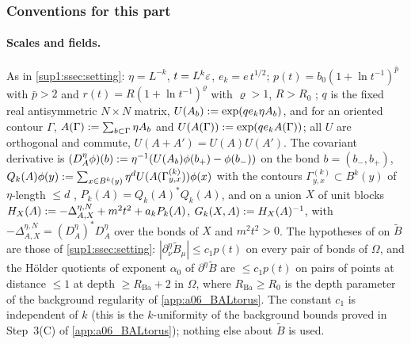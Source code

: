 \subsubsection*{Conventions for this part}

\paragraph{Scales and fields.} As in \cref{sup1:ssec:setting}: $\eta=L^{-k}$, $t=L^k\varepsilon$, $e_k=e\,t^{1/2}$; $p(t)=b_0(1+\ln t^{-1})^{\bar p}$ with $\bar p>2$ and $r(t)=R(1+\ln t^{-1})^{\varrho}$ with $\varrho>1$, $R>R_0$ \cite[(2.3), (2.7)]{Ba2}; $q$ is the fixed real antisymmetric $N\times N$ matrix, $U(A_b):=\exp(qe_k\eta A_b)$, and for an oriented contour $\Gamma$, $A(\Gamma):=\sum_{b\subset\Gamma}\eta A_b$ and $U(A(\Gamma)):=\exp(qe_kA(\Gamma))$; all $U$ are orthogonal and commute, $U(A+A')=U(A)U(A')$. The covariant derivative is $(D^\eta_A\phi)(b):=\eta^{-1}(U(A_b)\phi(b_+)-\phi(b_-))$ on the bond $b=(b_-,b_+)$, $Q_k(A)\phi(y):=\sum_{x\in B^k(y)}\eta^dU(A(\Gamma^{(k)}_{y,x}))\phi(x)$ with the contours $\Gamma^{(k)}_{y,x}\subset B^k(y)$ of $\eta$-length $\le d$ \cite[(1.13)]{Ba3}, $P_k(A)=Q_k(A)^*Q_k(A)$, and on a union $X$ of unit blocks $H_X(A):=-\Delta^{\eta,N}_{A,X}+m^2t^2+a_kP_k(A)$, $G_k(X,A):= H_X(A)^{-1}$, with $-\Delta^{\eta,N}_{A,X}=(D^\eta_A)^*D^\eta_A$ over the bonds of $X$ and $m^2t^2>0$. The hypotheses of \cite[p.~412]{Ba3} on $\tilde B$ are those of \cref{sup1:ssec:setting}: $|\partial^\eta_\nu\tilde B_\mu|\le c_1p(t)$ on every pair of bonds of $\Omega$, and the H\"older quotients of exponent $\alpha_0$ of $\partial^\eta\tilde B$ are $\le c_1p(t)$ on pairs of points at distance $\le1$ at depth $\ge R_{\mathrm{Ba}}+2$ in $\Omega$, where $R_{\mathrm{Ba}}\ge R_0$ is the depth parameter of the background regularity of \cref{app:a06_BALtorus}. The constant $c_1$ is independent of $k$ (this is the $k$-uniformity of the background bounds proved in Step~3(C) of \cref{app:a06_BALtorus}); nothing else about $\tilde B$ is used.


